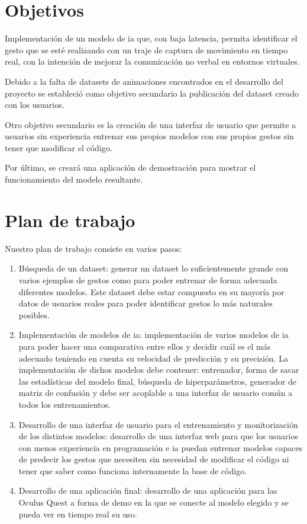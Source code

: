 \section{Objetivos}
Implementación de un modelo de \gls{ia} que, con baja latencia, permita identificar el gesto que se esté realizando con un traje de captura de movimiento en tiempo real, con  la intención de mejorar la comunicación no verbal en entornos virtuales.

Debido a la falta de datasets de animaciones encontrados en el desarrollo del proyecto se estableció como objetivo secundario la publicación del dataset creado con los usuarios.

Otro objetivo secundario es la creación de una interfaz de usuario que permite a usuarios sin experiencia entrenar sus propios modelos con sus propios gestos sin tener que modificar el código.

Por último, se creará una aplicación de demostración para mostrar el funcionamiento del modelo resultante.

\section{Plan de trabajo}
Nuestro plan de trabajo consiste en varios pasos:
\begin{enumerate}
	\item Búsqueda de un dataset: generar un dataset lo suficientemente grande con varios ejemplos de gestos como para poder entrenar de forma adecuada diferentes modelos. Este dataset debe estar compuesto en su mayoría por datos de usuarios reales para poder identificar gestos lo más naturales posibles.
	\item Implementación de modelos de \gls{ia}: implementación de varios modelos de \gls{ia} para poder hacer una comparativa entre ellos y decidir cuál es el más adecuado teniendo en cuenta su velocidad de predicción y su precisión. La implementación de dichos modelos debe contener: entrenador, forma de sacar las estadísticas del modelo final, búsqueda de hiperparámetros, generador de matriz de confusión y debe ser acoplable a una interfaz de usuario común a todos los entrenamientos.
	\item Desarrollo de una interfaz de usuario para el entrenamiento y monitorización de los distintos modelos: desarrollo de una interfaz web para que los usuarios con menos experiencia en programación e \gls{ia} puedan entrenar modelos capaces de predecir los gestos que necesiten sin necesidad de modificar el código ni tener que saber como funciona internamente la base de código.
	\item Desarrollo de una aplicación final: desarrollo de una aplicación para las Oculus Quest a forma de demo en la que se conecte al modelo elegido y se pueda ver en tiempo real su uso.
\end{enumerate}